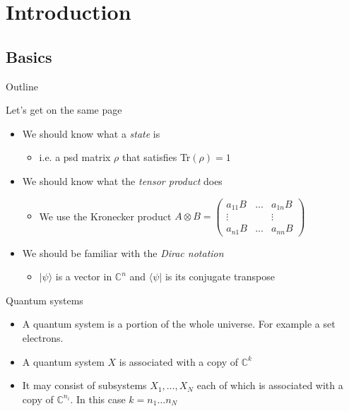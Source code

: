 \section{Introduction}
\subsection{Basics}
\begin{frame}{Outline}
\tableofcontents[currentsection]
\end{frame}


\begin{frame}{Let's get on the same page}
 \begin{itemize}
  \item \large{We should know what a \textit{state} is} \pause
	\begin{itemize}  	
  	\item i.e. a psd matrix $\rho$ that satisfies Tr$(\rho)=1$ \pause 
	\end{itemize}
 \item \large{We should know what the \textit{tensor product} does} \pause
	\begin{itemize}
		   \item We use the Kronecker product  $A \otimes B = \begin{pmatrix}
a_{11}B & \dots & a_{1n}B \\
\vdots && \vdots \\
a_{n1}B & \dots & a_{nn}B
\end{pmatrix}$
	\end{itemize}  
   \item \large{We should be familiar with the \textit{Dirac notation}} \pause
	\begin{itemize}	 
  	\item $\vert \psi \rangle$ is a vector in $\mathbb{C}^n$ and $\langle \psi \vert$ is its conjugate transpose
 \end{itemize}
 \end{itemize}

\begin{block}{Quantum systems}
	\begin{itemize}
		\item A quantum system is a portion of the whole universe. For example a set electrons. 
		\item A quantum system $X$ is associated with a copy of $\mathbb{C}^k$ 
		\item It may consist of subsystems $X_1, \dots , X_N$ each of which is associated with a copy of $\mathbb{C}^{n_i}$. In this case $k = n_1 \dots n_N$
	\end{itemize}
\end{block}

\end{frame}


